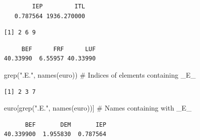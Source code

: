 \documentclass[
  letterpaper,
  DIV=11,
  numbers=noendperiod]{scrreprt}
\newenvironment{Shaded}{\begin{snugshade}}{\end{snugshade}}
\newcommand{\CommentTok}[1]{\textcolor[rgb]{0.37,0.37,0.37}{#1}}
\newcommand{\FunctionTok}[1]{\textcolor[rgb]{0.28,0.35,0.67}{#1}}
\newcommand{\NormalTok}[1]{\textcolor[rgb]{0.00,0.23,0.31}{#1}}
\newcommand{\StringTok}[1]{\textcolor[rgb]{0.13,0.47,0.30}{#1}}
\begin{document}
\begin{verbatim}
        IEP         ITL 
   0.787564 1936.270000 
\end{verbatim}

\begin{Shaded}
\end{Shaded}

\begin{verbatim}
[1] 2 6 9
\end{verbatim}

\begin{Shaded}
\end{Shaded}

\begin{verbatim}
     BEF      FRF      LUF 
40.33990  6.55957 40.33990 
\end{verbatim}

\begin{Shaded}
\begin{Highlighting}[]
\FunctionTok{grep}\NormalTok{(}\StringTok{".E."}\NormalTok{, }\FunctionTok{names}\NormalTok{(euro)) }\CommentTok{\# Indices of elements containing \_E\_}
\end{Highlighting}
\end{Shaded}

\begin{verbatim}
[1] 2 3 7
\end{verbatim}

\begin{Shaded}
\begin{Highlighting}[]
\NormalTok{euro[}\FunctionTok{grep}\NormalTok{(}\StringTok{".E."}\NormalTok{, }\FunctionTok{names}\NormalTok{(euro))] }\CommentTok{\# Names containing with \_E\_}
\end{Highlighting}
\end{Shaded}

\begin{verbatim}
      BEF       DEM       IEP 
40.339900  1.955830  0.787564 
\end{verbatim}
\end{document}
